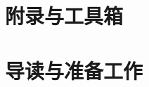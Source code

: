 \documentclass[fontsize=12pt, paper=a4, twoside, openright, DIV=calc]{scrbook}
\theoremstyle{break}
\begin{document}
\chapter{附录与工具箱}
% 

\chapter{导读与准备工作}
% 




\end{document}

